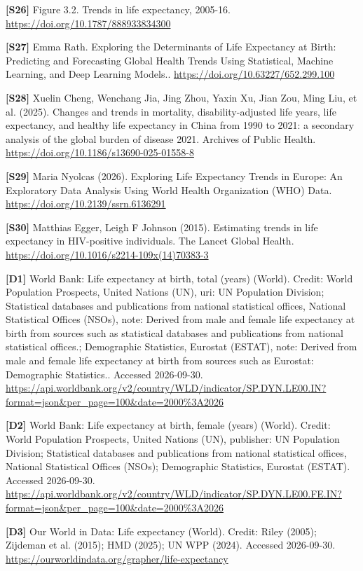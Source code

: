\documentclass[10pt,a4paper]{article}
\begin{document}
\noindent\textbf{[S26]} Figure 3.2. Trends in life expectancy, 2005-16. \url{https://doi.org/10.1787/888933834300}\par

\noindent\textbf{[S27]} Emma Rath. Exploring the Determinants of Life Expectancy at Birth: Predicting and Forecasting Global Health Trends Using Statistical, Machine Learning, and Deep Learning Models.. \url{https://doi.org/10.63227/652.299.100}\par

\noindent\textbf{[S28]} Xuelin Cheng, Wenchang Jia, Jing Zhou, Yaxin Xu, Jian Zou, Ming Liu, et al. (2025). Changes and trends in mortality, disability-adjusted life years, life expectancy, and healthy life expectancy in China from 1990 to 2021: a secondary analysis of the global burden of disease 2021. Archives of Public Health. \url{https://doi.org/10.1186/s13690-025-01558-8}\par

\noindent\textbf{[S29]} Maria Nyolcas (2026). Exploring Life Expectancy Trends in Europe: An Exploratory Data Analysis Using World Health Organization (WHO) Data. \url{https://doi.org/10.2139/ssrn.6136291}\par

\noindent\textbf{[S30]} Matthias Egger, Leigh F Johnson (2015). Estimating trends in life expectancy in HIV-positive individuals. The Lancet Global Health. \url{https://doi.org/10.1016/s2214-109x(14)70383-3}\par

\noindent\textbf{[D1]} World Bank: Life expectancy at birth, total (years) (World). Credit: World Population Prospects, United Nations (UN), uri: UN Population Division;
Statistical databases and publications from national statistical offices, National Statistical Offices (NSOs), note: Derived from male and female life expectancy at birth from sources such as statistical databases and publications from national statistical offices.;
Demographic Statistics, Eurostat (ESTAT), note: Derived from male and female life expectancy at birth from sources such as Eurostat: Demographic Statistics.. Accessed 2026-09-30. \url{https://api.worldbank.org/v2/country/WLD/indicator/SP.DYN.LE00.IN?format=json&per_page=100&date=2000%3A2026}\par

\noindent\textbf{[D2]} World Bank: Life expectancy at birth, female (years) (World). Credit: World Population Prospects, United Nations (UN), publisher: UN Population Division;
Statistical databases and publications from national statistical offices, National Statistical Offices (NSOs);
Demographic Statistics, Eurostat (ESTAT). Accessed 2026-09-30. \url{https://api.worldbank.org/v2/country/WLD/indicator/SP.DYN.LE00.FE.IN?format=json&per_page=100&date=2000%3A2026}\par

\noindent\textbf{[D3]} Our World in Data: Life expectancy (World). Credit: Riley (2005); Zijdeman et al. (2015); HMD (2025); UN WPP (2024). Accessed 2026-09-30. \url{https://ourworldindata.org/grapher/life-expectancy}\par
\end{document}
